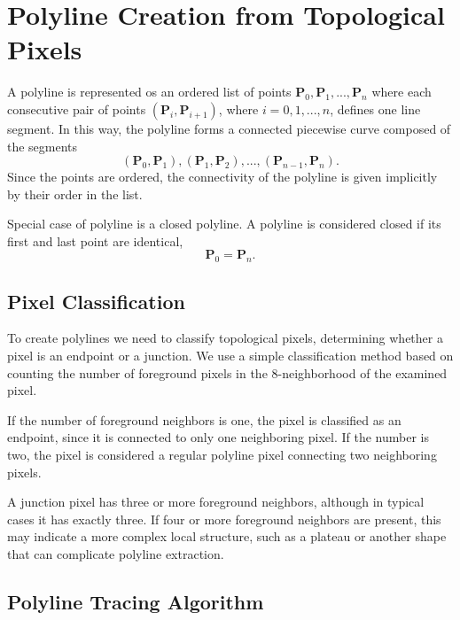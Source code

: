 \captionsetup[algorithm]{
	labelfont=bf,
	justification=raggedright,
	singlelinecheck=false
}

\section{Polyline Creation from Topological Pixels}

A polyline is represented os an ordered list of points $\mathbf{P}_0, \mathbf{P}_1, ..., \mathbf{P}_n$ where each consecutive pair of points $\left(\mathbf{P}_i, \mathbf{P}_{i+1}\right)$, where $i = 0,1,...,n$, defines one line segment. In this way, the polyline forms a connected piecewise curve composed of the segments
\begin{equation*}
	(\mathbf{P}_0, \mathbf{P}_1), (\mathbf{P}_1, \mathbf{P}_2), ..., (\mathbf{P}_{n-1}, \mathbf{P}_n).
\end{equation*}
Since the points are ordered, the connectivity of the polyline is given implicitly by their order in the list. 

Special case of polyline is a closed polyline. A polyline is considered closed if its first and last point are identical,
\begin{equation}
	\mathbf{P}_0 = \mathbf{P}_n.
\end{equation}

\subsection{Pixel Classification}

To create polylines we need to classify topological pixels, determining whether a pixel is an endpoint or a junction. We use a simple classification method based on counting the number of foreground pixels in the 8-neighborhood of the examined pixel.

If the number of foreground neighbors is one, the pixel is classified as an endpoint, since it is connected to only one neighboring pixel. If the number is two, the pixel is considered a regular polyline pixel connecting two neighboring pixels.

A junction pixel has three or more foreground neighbors, although in typical cases it has exactly three. If four or more foreground neighbors are present, this may indicate a more complex local structure, such as a plateau or another shape that can complicate polyline extraction.

\subsection{Polyline Tracing Algorithm}


